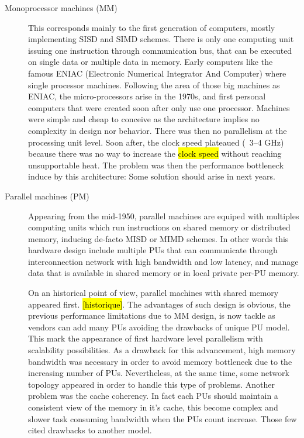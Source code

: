\begin{description}

\item[Monoprocessor machines (MM)] This corresponds mainly to the first generation of computers, mostly implementing SISD and SIMD schemes. There is only one computing unit issuing one instruction through communication bus, that can be executed on single data or multiple data in memory. Early computers like the famous ENIAC (Electronic Numerical Integrator And Computer) where single processor machines. Following the area of those big machines as ENIAC, the micro-processors arise in the 1970s, and first personal computers that were created soon after only use one processor. Machines were simple and cheap to conceive as the architecture implies no complexity in design nor behavior. There was then no parallelism at the processing unit level. Soon after, the clock speed plateaued (~3–4 GHz) because there was no way to increase the \hl{clock speed} without reaching unsupportable heat. The problem was then the performance bottleneck induce by this architecture: Some solution should arise in next years. 

\item [Parallel machines (PM)] Appearing from the mid-1950, parallel machines are equiped with multiples computing units which run instructions on shared memory or distributed memory, inducing de-facto MISD or MIMD schemes. In other words this hardware design include multiple PUs that can communicate through interconnection network with high bandwidth and low latency, and manage data that is available in shared memory or in local private per-PU memory.

On an historical point of view, parallel machines with shared memory appeared first. \hl{[historique]}. The advantages of such design is obvious, the previous performance limitations due to MM design, is now tackle as vendors can add many PUs avoiding the drawbacks of unique PU model. This mark the appearance of first hardware level parallelism with scalability possibilities. As a drawback for this advancement, high memory bandwidth was necessary in order to avoid memory bottleneck due to the increasing number of PUs. Nevertheless, at the same time, some network topology appeared in order to handle this type of problems. Another problem was the cache coherency. In fact each PUs should maintain a consistent view of the memory in it's cache, this become complex and slower task consuming bandwidth when the PUs count increase. Those few cited drawbacks to another model.


\end{description}

